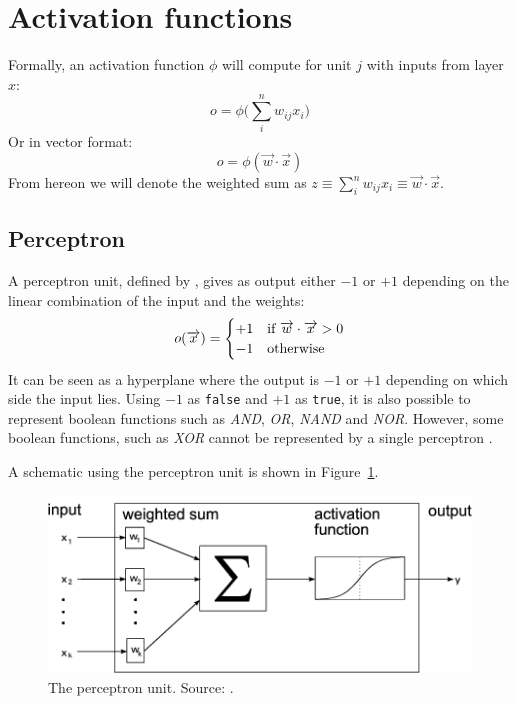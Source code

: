 \section{Activation functions} %
\label{sec:activation_functions}
Formally, an activation function $\phi$ will compute for unit $j$ with inputs from layer $x$:
\begin{equation}
    o = \phi\big(\sum_i^n w_{ij} x_i\big)
\end{equation}
Or in vector format:
\begin{equation}
    o = \phi(\overrightarrow{w} \cdot \overrightarrow{x})
\end{equation}
From hereon we will denote the weighted sum as $z \equiv \sum_i^n w_{ij} x_i \equiv \overrightarrow{w} \cdot \overrightarrow{x}$.\\

\subsection{Perceptron} %
\label{ssub:perceptron}
A perceptron unit, defined by \cite{Rosenblatt58}, gives as output either $-1$ or $+1$ depending on the linear combination of the input and the weights:
\begin{equation}
o(\overrightarrow{x}) = \begin{cases}
+1 & \text{if $ \overrightarrow{w} \cdot \overrightarrow{x} > 0$}\\
-1 & \text{otherwise}
\end{cases}
\end{equation}
It can be seen as a hyperplane where the output is $-1$ or $+1$ depending on which side the input lies.
Using $-1$ as \texttt{false} and $+1$ as \texttt{true}, it is also possible to represent boolean functions such as \textit{AND}, \textit{OR}, \textit{NAND} and \textit{NOR}. However, some boolean functions, such as \textit{XOR} cannot be represented by a single perceptron \parencite{ML}.

A schematic using the perceptron unit is shown in Figure~\ref{fig:perceptron}.\\
\begin{figure}[htb]
    \centering
    \includegraphics[width=.8\linewidth]{images/activation_functions/perceptron.png}
    \caption[The perceptron unit]{The perceptron unit. Source: \cite{Demant2013}.}
    \label{fig:perceptron}
\end{figure}


